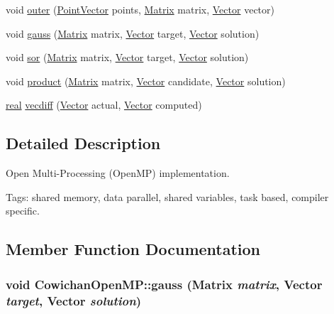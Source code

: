\begin{CompactItemize}
\item 
void \hyperlink{class_cowichan_open_m_p_99a0570f754ac82968d73093476de533}{outer} (\hyperlink{class_point}{PointVector} points, \hyperlink{cowichan_8hpp_3fb46f939e55c239fbc95656fc0f3399}{Matrix} matrix, \hyperlink{cowichan_8hpp_02bc1553e241b9b33408482658b3c355}{Vector} vector)
\item 
void \hyperlink{class_cowichan_open_m_p_363bcd6f0c7b4d0fced94fe4cd59a267}{gauss} (\hyperlink{cowichan_8hpp_3fb46f939e55c239fbc95656fc0f3399}{Matrix} matrix, \hyperlink{cowichan_8hpp_02bc1553e241b9b33408482658b3c355}{Vector} target, \hyperlink{cowichan_8hpp_02bc1553e241b9b33408482658b3c355}{Vector} solution)
\item 
void \hyperlink{class_cowichan_open_m_p_d6482d0369a26a51ef0e37ab238fc664}{sor} (\hyperlink{cowichan_8hpp_3fb46f939e55c239fbc95656fc0f3399}{Matrix} matrix, \hyperlink{cowichan_8hpp_02bc1553e241b9b33408482658b3c355}{Vector} target, \hyperlink{cowichan_8hpp_02bc1553e241b9b33408482658b3c355}{Vector} solution)
\item 
void \hyperlink{class_cowichan_open_m_p_41d0067382570d1e784f62f2c5963d49}{product} (\hyperlink{cowichan_8hpp_3fb46f939e55c239fbc95656fc0f3399}{Matrix} matrix, \hyperlink{cowichan_8hpp_02bc1553e241b9b33408482658b3c355}{Vector} candidate, \hyperlink{cowichan_8hpp_02bc1553e241b9b33408482658b3c355}{Vector} solution)
\item 
\hyperlink{cowichan_8hpp_4d521b2c54a1f6312cc8fa04827eaf98}{real} \hyperlink{class_cowichan_open_m_p_92aa23ed47da0a5a3b43416ab08199b3}{vecdiff} (\hyperlink{cowichan_8hpp_02bc1553e241b9b33408482658b3c355}{Vector} actual, \hyperlink{cowichan_8hpp_02bc1553e241b9b33408482658b3c355}{Vector} computed)
\end{CompactItemize}


\subsection{Detailed Description}
Open Multi-Processing (OpenMP) implementation. 

Tags: shared memory, data parallel, shared variables, task based, compiler specific. 

\subsection{Member Function Documentation}
\hypertarget{class_cowichan_open_m_p_363bcd6f0c7b4d0fced94fe4cd59a267}{
\subsubsection[{gauss}]{\setlength{\rightskip}{0pt plus 5cm}void CowichanOpenMP::gauss ({\bf Matrix} {\em matrix}, \/  {\bf Vector} {\em target}, \/  {\bf Vector} {\em solution})}}
\label{class_cowichan_open_m_p_363bcd6f0c7b4d0fced94fe4cd59a267}


